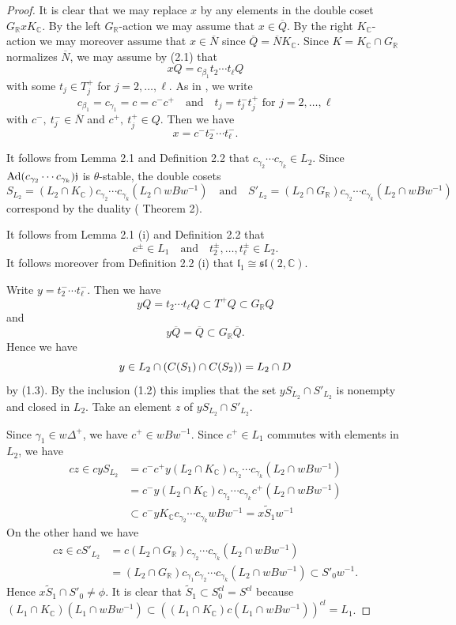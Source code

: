 \documentclass[12pt,a4paper]{amsart}
\def\frak{\mathfrak}
\theoremstyle{definition}
\theoremstyle{remark}
\numberwithin{equation}{section}
\def\br{\mathbb R}
\def\bc{\mathbb C}
\def\mand{\quad\mbox{and}\quad}
\def\Ad{{\rm Ad}}
\begin{document}
\begin{proof} It is clear that we may replace $x$ by any elements in the double coset $G_\br xK_\bc$. By the left $G_\br$-action we may assume that $x\in\overline{Q}$. By the right $K_\bc$-action we may moreover assume that $x\in\overline{N}$ since $\overline{Q}=\overline{N}K_\bc$. Since $K=K_\bc\cap G_\br$ normalizes $\overline{N}$, we may assume by (2.1) that
$$xQ=c_{\beta_1}t_2\cdots t_\ell Q$$
with some $t_j\in T^+_j$ for $j=2,\ldots,\ell$. As in \cite{WZ1}, we write
$$c_{\beta_1}=c_{\gamma_1}=c=c^-c^+\mand t_j=t_j^-t_j^+\mbox{ for }j=2,\ldots,\ell$$
with $c^-,\ t_j^-\in\overline{N}$ and $c^+,\ t_j^+\in Q$. Then we have
$$x=c^-t_2^-\cdots t_\ell^-.$$

It follows from Lemma 2.1 and Definition 2.2 that $c_{\gamma_2}\cdots c_{\gamma_k}\in L_2$. Since $\Ad(c_{\gamma_2}\cdots c_{\gamma_k}) \frak{j}$ is $\theta$-stable, the double cosets
$$S_{L_2}=(L_2\cap K_\bc)c_{\gamma_2}\cdots c_{\gamma_k}(L_2\cap wBw^{-1}) \mand S'_{L_2}=(L_2\cap G_\br)c_{\gamma_2}\cdots c_{\gamma_k}(L_2\cap wBw^{-1})$$
correspond by the duality (\cite{M1} Theorem 2). 

It follows from Lemma 2.1 (i) and Definition 2.2 that
$$c^\pm\in L_1\mand t_2^\pm,\ldots, t_\ell^\pm\in L_2.$$
It follows moreover from Definition 2.2 (i) that $\frak{l}_1\cong \frak{sl}(2,\bc)$.

Write $y=t_2^-\cdots t_\ell^-$. Then we have
$$yQ=t_2\cdots t_\ell Q\subset T^+Q\subset G_\br Q$$
and
$$y\overline{Q}=\overline{Q}\subset G_\br\overline{Q}.$$
Hence we have
\begin{equation}
y\in L_2\cap (C(S_1)\cap C(S_2))=L_2\cap D \notag
\end{equation}
by \cite{GM1} (1.3). By the inclusion (1.2) this implies that the set $yS_{L_2}\cap S'_{L_2}$ is nonempty and closed in $L_2$. Take an element $z$ of $yS_{L_2}\cap S'_{L_2}$.

Since $\gamma_1\in w\Delta^+$, we have $c^+\in wBw^{-1}$. Since $c^+\in L_1$ commutes with elements in $L_2$, we have
\begin{align*}
cz\in cyS_{L_2} & = c^-c^+y(L_2\cap K_\bc) c_{\gamma_2}\cdots c_{\gamma_k}(L_2\cap wBw^{-1}) \\
& =c^-y(L_2\cap K_\bc) c_{\gamma_2}\cdots c_{\gamma_k}c^+(L_2\cap wBw^{-1}) \\
& \subset c^-yK_\bc c_{\gamma_2}\cdots c_{\gamma_k}wBw^{-1} =x\widetilde{S}_1w^{-1}
\end{align*}
On the other hand we have
\begin{align*}
cz\in cS'_{L_2} & = c(L_2\cap G_\br) c_{\gamma_2}\cdots c_{\gamma_k}(L_2\cap wBw^{-1}) \\
& =(L_2\cap G_\br) c_{\gamma_1}c_{\gamma_2}\cdots c_{\gamma_k}(L_2\cap wBw^{-1}) \subset S'_0w^{-1}.
\end{align*}
Hence $x\widetilde{S}_1\cap S'_0\ne\phi$. It is clear that $\widetilde{S}_1\subset S_0^{cl}=S^{cl}$ because $(L_1\cap K_\bc)(L_1\cap wBw^{-1})\subset ((L_1\cap K_\bc)c(L_1\cap wBw^{-1}))^{cl}=L_1$.


\end{proof}
\end{document}
